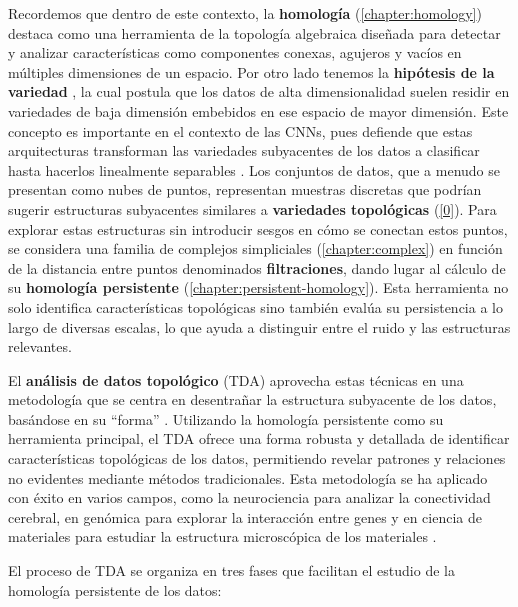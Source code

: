Recordemos que dentro de este contexto, la \textbf{homología} (\autoref{chapter:homology}) destaca como una herramienta de la topología algebraica diseñada para detectar y analizar características como componentes conexas, agujeros y vacíos en múltiples dimensiones de un espacio. Por otro lado tenemos la \textbf{hipótesis de la variedad} \cite{fefferman2013testingmanifoldhypothesis}, la cual postula que los datos de alta dimensionalidad suelen residir en variedades de baja dimensión embebidos en ese espacio de mayor dimensión. Este concepto es importante en el contexto de las CNNs, pues defiende que estas arquitecturas transforman las variedades subyacentes de los datos a clasificar hasta hacerlos linealmente separables \cite{cohen2020separability}. Los conjuntos de datos, que a menudo se presentan como nubes de puntos, representan muestras discretas que podrían sugerir estructuras subyacentes similares a \textbf{variedades topológicas} (\autoref{0}). Para explorar estas estructuras sin introducir sesgos en cómo se conectan estos puntos, se considera una familia de complejos simpliciales (\autoref{chapter:complex}) en función de la distancia entre puntos denominados \textbf{filtraciones}, dando lugar al cálculo de su \textbf{homología persistente} (\autoref{chapter:persistent-homology}). Esta herramienta no solo identifica características topológicas sino también evalúa su persistencia a lo largo de diversas escalas, lo que ayuda a distinguir entre el ruido y las estructuras relevantes.

El \textbf{análisis de datos topológico} (TDA) aprovecha estas técnicas en una metodología que se centra en desentrañar la estructura subyacente de los datos, basándose en su \enquote{forma} \cite{carlsson2009topology}. Utilizando la homología persistente como su herramienta principal, el TDA ofrece una forma robusta y detallada de identificar características topológicas de los datos, permitiendo revelar patrones y relaciones no evidentes mediante métodos tradicionales. Esta metodología se ha aplicado con éxito en varios campos, como la neurociencia para analizar la conectividad cerebral, en genómica para explorar la interacción entre genes y en ciencia de materiales para estudiar la estructura microscópica de los materiales \cite{10.3389/frai.2021.667963}.

El proceso de TDA se organiza en tres fases que facilitan el estudio de la homología persistente de los datos:

